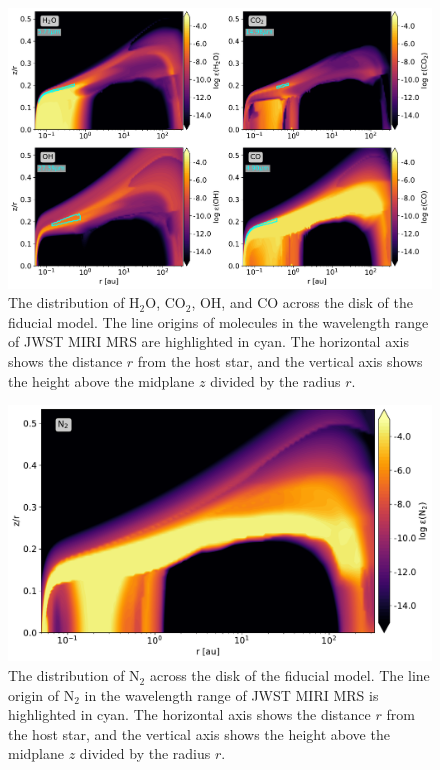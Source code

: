 \documentclass[twoside, single, authoryear, semicolon, 12pt]{lion-msc}
\newcommand{\4}{$_4$}
\newcommand{\3}{$_3$}
\newcommand{\2}{$_2$}
\begin{document}
\begin{figure}[H]
    \centering
    \includegraphics[width=\linewidth]{Figures/Abundance1.pdf}
    \caption{The distribution of H\2O, CO\2, OH, and CO across the disk of the fiducial model. The line origins of molecules in the wavelength range of JWST MIRI MRS are highlighted in cyan. The horizontal axis shows the distance $r$ from the host star, and the vertical axis shows the height above the midplane $z$ divided by the radius $r$.}
    \label{fig: others distribution}
\end{figure}
\lipsum[1]
\begin{figure}[H]
    \centering
    \includegraphics[width=.8\linewidth]{Figures/AbundanceN2.pdf}
    \caption{The distribution of N\2 across the disk of the fiducial model. The line origin of N\2 in the wavelength range of JWST MIRI MRS is highlighted in cyan. The horizontal axis shows the distance $r$ from the host star, and the vertical axis shows the height above the midplane $z$ divided by the radius $r$.}
    \label{fig: n2 distribution}
\end{figure}
\lipsum[2]
\lipsum[2]
\end{document}
